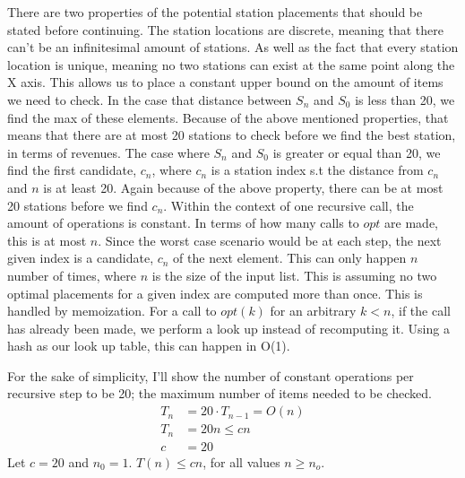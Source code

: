 \documentclass[10pt]{article}
\begin{document}
\begin{question}
\begin{enumerate}[a)]
There are two properties of the potential station placements that should be stated before continuing. The station locations are discrete, meaning that there can't be an infinitesimal amount of stations. As well as the fact that every station location is unique, meaning no two stations can exist at the same point along the X axis.  This allows us to place a constant upper bound on the amount of items we need to check.
\newline \newline
In the case that distance between $S_n$ and $S_0$ is less than 20, we find the max of these elements. Because of the above mentioned properties, that means that there are at most 20 stations to check before we find the best station, in terms of revenues.
\newline \newline
The case where $S_n$ and $S_0$ is greater or equal than 20, we find the first candidate, $c_n$, where $c_n$ is a station index s.t the distance from $c_n$ and $n$ is at least 20. Again because of the above property, there can be at most 20 stations before we find $c_n$.
\newline \newline
Within the context of one recursive call, the amount of operations is constant. In terms of how many calls to $opt$ are made, this is at most $n$. Since the worst case scenario would be at each step, the next given index is a candidate, $c_n$ of the next element. This can only happen $n$ number of times, where $n$ is the size of the input list. This is assuming no two optimal placements for a given index are computed more than once. This is handled by memoization. For a call to $opt(k)$ for an arbitrary $k < n$, if the call has already been made, we perform a look up instead of recomputing it. Using a hash as our look up table, this can happen in O(1).

For the sake of simplicity, I'll show the number of constant operations per recursive step to be 20; the maximum number of items needed to be checked.
\begin{align*}
    T_n &= 20 \cdot T_{n-1} = O(n) \\
    T_n &= 20n \leq cn \\
       c &= 20
\end{align*}
Let $c=20$ and $n_0 = 1$. $T(n) \leq cn$, for all values $n \geq n_o$.
\end{enumerate}  

\end{question}
\end{document}
